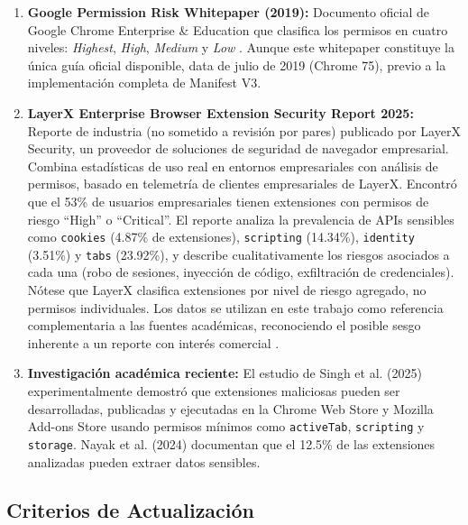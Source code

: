 \documentclass[12pt,oneside]{report}
\begin{document}
\begin{enumerate}
    \item \textbf{Google Permission Risk Whitepaper (2019):} Documento oficial de Google Chrome Enterprise \& Education que clasifica los permisos en cuatro niveles: \textit{Highest}, \textit{High}, \textit{Medium} y \textit{Low} \cite{google_permission_risk}. Aunque este whitepaper constituye la única guía oficial disponible, data de julio de 2019 (Chrome 75), previo a la implementación completa de Manifest V3.
    
    \item \textbf{LayerX Enterprise Browser Extension Security Report 2025:} Reporte de industria (no sometido a revisión por pares) publicado por LayerX Security, un proveedor de soluciones de seguridad de navegador empresarial. Combina estadísticas de uso real en entornos empresariales con análisis de permisos, basado en telemetría de clientes empresariales de LayerX. Encontró que el 53\% de usuarios empresariales tienen extensiones con permisos de riesgo ``High'' o ``Critical''. El reporte analiza la prevalencia de APIs sensibles como \texttt{cookies} (4.87\% de extensiones), \texttt{scripting} (14.34\%), \texttt{identity} (3.51\%) y \texttt{tabs} (23.92\%), y describe cualitativamente los riesgos asociados a cada una (robo de sesiones, inyección de código, exfiltración de credenciales). Nótese que LayerX clasifica extensiones por nivel de riesgo agregado, no permisos individuales. Los datos se utilizan en este trabajo como referencia complementaria a las fuentes académicas, reconociendo el posible sesgo inherente a un reporte con interés comercial \cite{layerx2025report}.


    
    \item \textbf{Investigación académica reciente:} El estudio de Singh et al. (2025) \cite{singh2025study} experimentalmente demostró que extensiones maliciosas pueden ser desarrolladas, publicadas y ejecutadas en la Chrome Web Store y Mozilla Add-ons Store usando permisos mínimos como \texttt{activeTab}, \texttt{scripting} y \texttt{storage}. Nayak et al. (2024) \cite{nayak2024experimental} documentan que el 12.5\% de las extensiones analizadas pueden extraer datos sensibles.
\end{enumerate}

\subsection{Criterios de Actualización}
\end{document}

